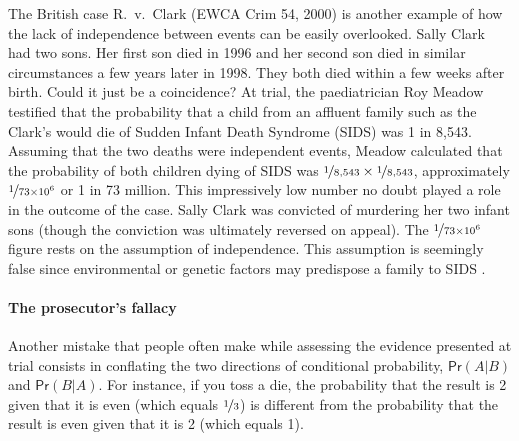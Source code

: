\documentclass{article}
\newcommand{\pr}{\mathsf{Pr}}
\begin{document}
The British case  
R.\ v.\ Clark (EWCA Crim 54, 2000) 
is another example of how 
the lack of independence between events can be easily overlooked. %
Sally Clark had two sons. Her first son died in 1996 and her second son died in similar circumstances a few years later in 1998. They both died within a few weeks  after birth. Could it just be a coincidence? At trial,  the paediatrician Roy Meadow testified that the probability that a child from an affluent family such as the Clark's would die of Sudden Infant Death Syndrome (SIDS) was 1 in 8,543. Assuming that the two deaths were independent events, Meadow calculated that the probability of both children dying of SIDS was $\nicefrac{1}{8,543}\times \nicefrac{1}{8,543}$, approximately $\nicefrac{1}{73\times 10^6}$ or 1 in 73 million.
This impressively low number no doubt played a role in the outcome of the case. 
Sally Clark was convicted of murdering her two infant sons (though the conviction was ultimately reversed on appeal). 
The $\nicefrac{1}{73\times 10^6}$ figure rests on the assumption of independence. This assumption is seemingly false since environmental or genetic factors may predispose a family to SIDS \citep[for a fuller discussion of this point, see][]{Dawid02, sasardic207, Barker2017}.



\paragraph{The prosecutor's fallacy}

Another mistake that people often make while assessing the evidence presented at trial consists in conflating the two directions of conditional probability, $\pr(A\vert B)$ and $\pr(B \vert A)$. For instance, if you toss a die, the probability that the result is 2 given that it is even (which equals $\nicefrac{1}{3}$) is different from the probability that the result is even given that it is 2 (which equals 1). 
\end{document}
